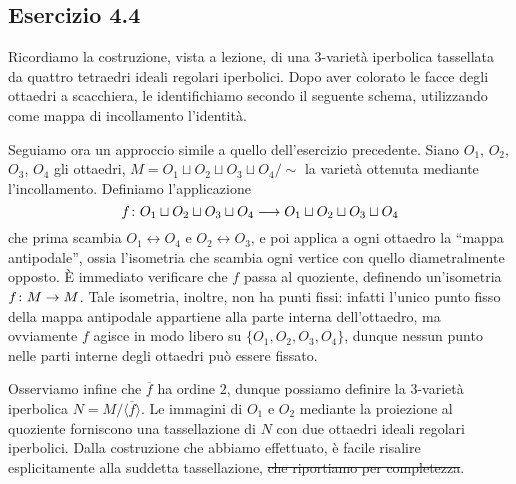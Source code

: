 \begin{center}
\end{center}

\newpage
\subsection*{Esercizio 4.4}
Ricordiamo la costruzione, vista a lezione, di una $3$-varietà iperbolica tassellata da quattro tetraedri ideali regolari iperbolici. Dopo aver colorato le facce degli ottaedri a scacchiera, le identifichiamo secondo il seguente schema, utilizzando come mappa di incollamento l'identità.

Seguiamo ora un approccio simile a quello dell'esercizio precedente. Siano $O_1$, $O_2$, $O_3$, $O_4$ gli ottaedri, $M=O_1\sqcup O_2\sqcup O_3\sqcup O_4/\sim$ la varietà ottenuta mediante l'incollamento. Definiamo l'applicazione
\[
\map{f}{O_1\sqcup O_2\sqcup O_3\sqcup O_4}{O_1\sqcup O_2\sqcup O_3\sqcup O_4}
\]
che prima scambia $O_1\leftrightarrow O_4$ e $O_2\leftrightarrow O_3$, e poi applica a ogni ottaedro la ``mappa antipodale'', ossia l'isometria che scambia ogni vertice con quello diametralmente opposto. È immediato verificare che $f$ passa al quoziente, definendo un'isometria $\map{f}{M}{M}$. Tale isometria, inoltre, non ha punti fissi: infatti l'unico punto fisso della mappa antipodale appartiene alla parte interna dell'ottaedro, ma ovviamente $f$ agisce in modo libero su $\{O_1,O_2,O_3,O_4\}$, dunque nessun punto nelle parti interne degli ottaedri può essere fissato.

Osserviamo infine che $\overline{f}$ ha ordine $2$, dunque possiamo definire la $3$-varietà iperbolica $N=M/\langle\overline{f}\rangle$. Le immagini di $O_1$ e $O_2$ mediante la proiezione al quoziente forniscono una tassellazione di $N$ con due ottaedri ideali regolari iperbolici. Dalla costruzione che abbiamo effettuato, è facile risalire esplicitamente alla suddetta tassellazione, \sout{che riportiamo per completezza}.
